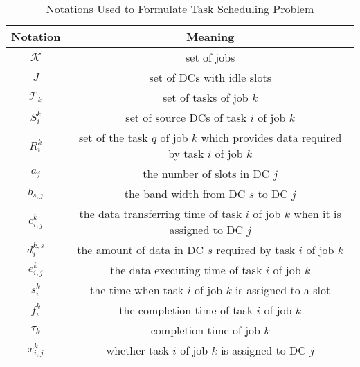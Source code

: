 \begin{table}[htb]
\caption{Notations Used to Formulate Task Scheduling Problem}\label{tab-notation}
\centering
\begin{tabular}{|c|c|}
\hline
Notation & Meaning  \\
\hline
$\mathcal{K}$ & set of jobs \\
$J$&  set of DCs with idle slots \\
$\mathcal{T}_k$ & set of tasks of job $k$ \\
$S_i^k$ & set of source DCs of task $i$ of job $k$ \\
$R_i^k$ & set of the task $q$ of job $k$ which provides data required by task $i$ of job $k$\\
$a_j$ & the number of slots in DC $j$\\
$b_{s,j}$ & the band width from DC $s$ to DC $j$\\
$c_{i,j}^k$ & the data transferring time of task $i$ of job $k$ when it is assigned to DC $j$\\
$d_{i}^{k,s}$ & the amount of data in DC $s$ required by task $i$ of job $k$\\
$e_{i,j}^k$ & the data executing time of task $i$ of job $k$ \\
$s_i^k$ & the time when task $i$ of job $k$ is assigned to a slot\\
$f_i^k$ & the completion time of task $i$ of job $k$\\
$\tau_k$ & completion time of job $k$\\
$x_{i,j}^k$ & whether task $i$ of job $k$ is assigned to DC $j$\\
\hline
\end{tabular}
\end{table}